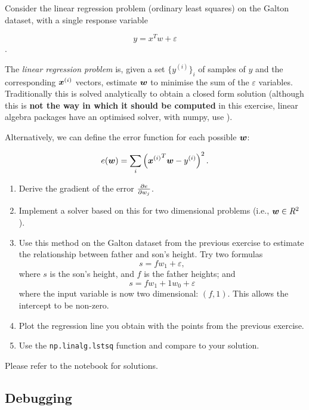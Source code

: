 \begin{exercise}
Consider the linear regression problem (ordinary least squares) on the Galton
dataset, with a single response variable

\[
y = x^T w + \varepsilon
\].

The \emph{linear regression problem} is, given a set $\{ y^{(i)} \}_i$ of
samples of $y$ and the corresponding $\bm{x}^{(i)}$ vectors, estimate
$\bm{w}$ to minimise the sum of the $\varepsilon$ variables. Traditionally
this is solved analytically to obtain a closed form solution (although this is
\textbf{not the way in which it should be computed} in this exercise, linear algebra packages
have an optimised solver, with numpy, use ).

Alternatively, we can define the error function for each possible $\bm{w}$:

\[
e(\bm{w}) = \sum_i \left( {\bm{x}^{(i)}}^T \bm{w} - y^{(i)} \right)^2.
\]

\begin{enumerate}
\item Derive the gradient of the error $\frac{\partial e}{\partial w_j}$.
\item Implement a solver based on this for two dimensional problems (i.e.,
$\bm{w} \in R^2$).
\item Use this method on the Galton dataset from the previous exercise to
estimate the relationship between father and son's height. Try two formulas
\begin{equation}
s = f w_1 + \varepsilon,
\label{}
\end{equation}
where $s$ is the son's height, and $f$ is the father heights; and
\begin{equation}
s = f w_1 + 1w_0 + \varepsilon
\label{}
\end{equation}
where the input variable is now two dimensional: $(f,1)$. This allows the
intercept to be non-zero.
\item Plot the regression line you obtain with the points from the previous
exercise.
\item Use the \texttt{np.linalg.lstsq} function and compare to your solution.
\end{enumerate}

Please refer to the notebook for solutions.
\end{exercise}

\subsection{Debugging}


